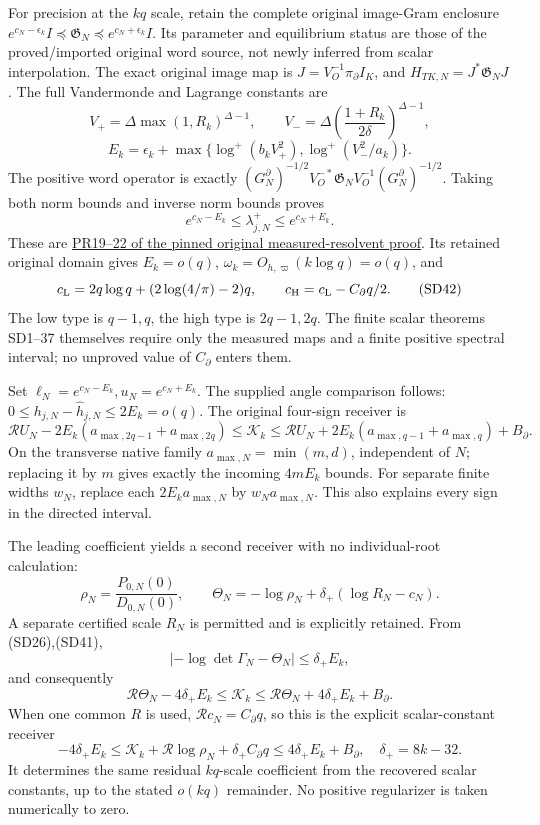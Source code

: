 \documentclass[11pt]{article}
\begin{document}
For precision at the \(kq\) scale, retain the complete original image-Gram enclosure \(e^{c_N-\epsilon_k}I\preceq\mathfrak G_N\preceq e^{c_N+\epsilon_k}I\). Its parameter and equilibrium status are those of the proved/imported original word source, not newly inferred from scalar interpolation. The exact original image map is \(J=V_O^{-1}\pi_\partial I_K\), and \(H_{TK,N}=J^*\mathfrak G_NJ\). The full Vandermonde and Lagrange constants are \[
V_+=\Delta\max(1,R_k)^{\Delta-1},\qquad
V_-=\Delta\left(\frac{1+R_k}{2\delta}\right)^{\Delta-1},
\] \[
E_k=\epsilon_k+
\max\{\log^+(b_kV_+^2),\log^+(V_-^2/a_k)\}.
\tag{SD40}
\] The positive word operator is exactly \((G_N^\partial)^{-1/2}V_O^{-*}\mathfrak G_NV_O^{-1}(G_N^\partial)^{-1/2}\). Taking both norm bounds and inverse norm bounds proves \[
e^{c_N-E_k}\le\lambda_{j,N}^+\le e^{c_N+E_k}.
\tag{SD41}
\] These are \href{https://github.com/KokunoYumeto/zeta-function-research-reader/blob/13ca9b136fcdae48df7454bd9bf99e1ef22dd03c/workbenches/splitzero-tandem/continuations/20260922-original-growth-resolvent/RECEIVED_RESOLVENT_PROOFS.md}{PR19--22 of the pinned original measured-resolvent proof}. Its retained original domain gives \(E_k=o(q)\), \(\omega_k=O_{h,\varpi}(k\log q)=o(q)\), and \[
c_{\rm L}=2q\log q+(2\log(4/\pi)-2)q,\qquad
c_{\rm H}=c_{\rm L}-C_\partial q/2.
\tag{SD42}
\] The low type is \(q-1,q\), the high type is \(2q-1,2q\). The finite scalar theorems SD1--37 themselves require only the measured maps and a finite positive spectral interval; no unproved value of \(C_\partial\) enters them.

Set \(\ell_N=e^{c_N-E_k},u_N=e^{c_N+E_k}\). The supplied angle comparison follows: \(0\le h_{j,N}-\widehat h_{j,N}\le2E_k=o(q)\). The original four-sign receiver is \[
\mathcal R U_N-2E_k(a_{\max,2q-1}+a_{\max,2q})
\le\mathcal K_k
\le\mathcal R U_N+2E_k(a_{\max,q-1}+a_{\max,q})+B_\partial.
\tag{SD43}
\] On the transverse native family \(a_{\max,N}=\min(m,d)\), independent of \(N\); replacing it by \(m\) gives exactly the incoming \(4mE_k\) bounds. For separate finite widths \(w_N\), replace each \(2E_ka_{\max,N}\) by \(w_Na_{\max,N}\). This also explains every sign in the directed interval.

The leading coefficient yields a second receiver with no individual-root calculation: \[
\rho_N=\frac{P_{0,N}(0)}{D_{0,N}(0)},\qquad
\Theta_N=-\log\rho_N+\delta_+(\log R_N-c_N).
\tag{SD44}
\] A separate certified scale \(R_N\) is permitted and is explicitly retained. From (SD26),(SD41), \[
|-\log\det\Gamma_N-\Theta_N|\le\delta_+E_k,
\] and consequently \[
\mathcal R\Theta_N-4\delta_+E_k
\le\mathcal K_k
\le\mathcal R\Theta_N+4\delta_+E_k+B_\partial.
\tag{SD45}
\] When one common \(R\) is used, \(\mathcal Rc_N=C_\partial q\), so this is the explicit scalar-constant receiver \[
-4\delta_+E_k
\le
\mathcal K_k+\mathcal R\log\rho_N+\delta_+C_\partial q
\le4\delta_+E_k+B_\partial,
\quad\delta_+=8k-32.
\tag{SD46}
\] It determines the same residual \(kq\)-scale coefficient from the recovered scalar constants, up to the stated \(o(kq)\) remainder. No positive regularizer is taken numerically to zero.
\end{document}
